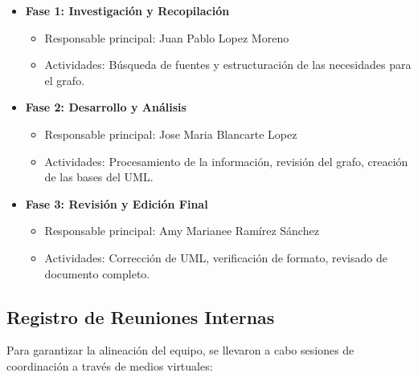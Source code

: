 \documentclass[12pt,a4paper]{article}
\begin{document}
\begin{itemize}
    \item \textbf{Fase 1: Investigación y Recopilación}
    \begin{itemize}
        \item Responsable principal: Juan Pablo Lopez Moreno
        \item Actividades: Búsqueda de fuentes y estructuración de las necesidades para el grafo.
    \end{itemize}
    \item \textbf{Fase 2: Desarrollo y Análisis}
    \begin{itemize}
        \item Responsable principal: Jose Maria Blancarte Lopez
        \item Actividades: Procesamiento de la información, revisión del grafo, creación de las bases del UML.
    \end{itemize}
    \item \textbf{Fase 3: Revisión y Edición Final}
    \begin{itemize}
        \item Responsable principal: Amy Marianee Ramírez Sánchez
        \item Actividades: Corrección de UML, verificación de formato, revisado de documento completo.
    \end{itemize}
\end{itemize}

\subsection{Registro de Reuniones Internas}
Para garantizar la alineación del equipo, se llevaron a cabo sesiones de coordinación a través de medios virtuales:
\end{document}
